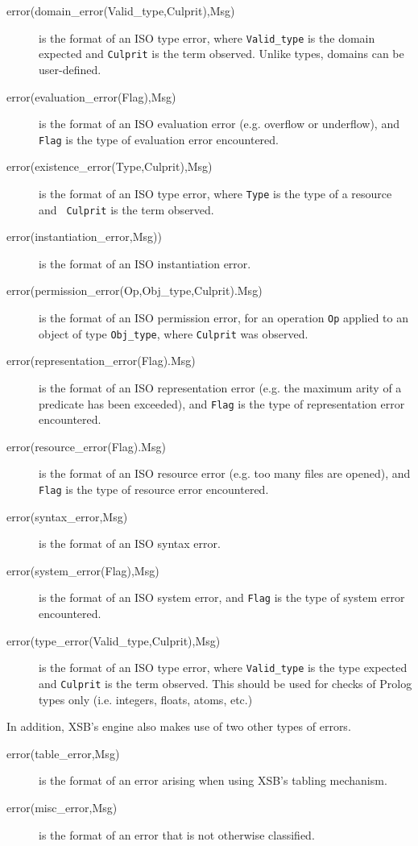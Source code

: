 \begin{description}
\item [error(domain\_error(Valid\_type,Culprit),Msg)] is the format of
  an ISO type error, where {\tt Valid\_type} is the domain expected
  and {\tt Culprit} is the term observed.  Unlike types, domains can
  be user-defined.
%
\item[error(evaluation\_error(Flag),Msg)] is the format of an ISO
  evaluation error (e.g. overflow or underflow), and {\tt Flag} is the
  type of evaluation error encountered.
%
\item [error(existence\_error(Type,Culprit),Msg)] is the format of an
  ISO type error, where {\tt Type} is the type of a resource and {\tt
    Culprit} is the term observed.
%
\item[error(instantiation\_error,Msg))] is the format of an ISO
  instantiation error.
%
\item [error(permission\_error(Op,Obj\_type,Culprit).Msg)] is the format of
  an ISO permission error, for an operation {\tt Op} applied to an
  object of type {\tt Obj\_type}, where {\tt Culprit} was observed.
%
\item[error(representation\_error(Flag).Msg)] is the format of an ISO
  representation error (e.g. the maximum arity of a predicate has been
  exceeded), and {\tt Flag} is the type of representation error
  encountered.
%
\item[error(resource\_error(Flag).Msg)] is the format of an ISO
  resource error (e.g. too many files are opened), and {\tt Flag} is
  the type of resource error encountered.
%
\item[error(syntax\_error,Msg)] is the format of an ISO syntax error.
%
\item[error(system\_error(Flag),Msg)] is the format of an ISO system error,
  and {\tt Flag} is the type of system error encountered.
%
\item[error(type\_error(Valid\_type,Culprit),Msg)] is the format of an
  ISO type error, where {\tt Valid\_type} is the type expected and
  {\tt Culprit} is the term observed.  This should be used for checks
  of Prolog types only (i.e. integers, floats, atoms, etc.)
%
\end{description}

In addition, XSB's engine also makes use of two other types of errors.
%
\begin{description}
\item[error(table\_error,Msg)] is the format of an error arising when using
  XSB's tabling mechanism.
%
\item[error(misc\_error,Msg)] is the format of an error that is not
  otherwise classified.
%
\end{description}

